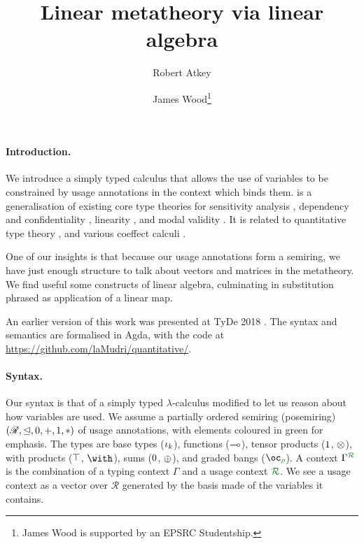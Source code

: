 \documentclass[a4paper]{easychair}
\begin{document}
\title{Linear metatheory via linear algebra}

\author{
  Robert Atkey
  \and
  James Wood\thanks{James Wood is supported by an EPSRC Studentship.}
}



\maketitle

\paragraph{Introduction.}

We introduce a simply typed calculus \name{} that allows the use of variables to
be constrained by usage annotations in the context which binds them.
\name{} is a generalisation of existing core type theories for sensitivity analysis
\cite{reed10distance}, dependency and confidentiality \cite{abadi99core},
linearity \cite{Barber1996}, and modal validity \cite{judgmental}.
It is related to quantitative type theory \cite{quantitative-type-theory}, and
various coeffect calculi \cite{PetricekOM14,BrunelGMZ14,GhicaS14}.

One of our insights is that because our usage annotations form a semiring, we
have just enough structure to talk about vectors and matrices in the metatheory.
We find useful some constructs of linear algebra, culminating in substitution
phrased as application of a linear map.

An earlier version of this work was presented at TyDe 2018
\cite{context-constrained}.
The syntax and semantics are formalised in Agda, with the code at
\url{https://github.com/laMudri/quantitative/}.

\paragraph{Syntax.}

Our syntax is that of a simply typed $\lambda$-calculus modified to let us
reason about how variables are used.
We assume a partially ordered semiring (posemiring) $(\mathscr R, \trianglelefteq, 0,
+, 1, *)$ of usage annotations, with elements coloured in green for emphasis.
The types are base types ($\iota_k$), functions ($\multimap$), tensor products
($1$, $\otimes$), with products ($\top$, $\withT{}{}$), sums
($0$, $\oplus$), and graded bangs ($\excl{\rho}{}$).
A context $\ctx{\Gamma}{R}$ is the combination of a typing context $\Gamma$ and
a usage context $\resctx R$.
We see a usage context as a vector over $\mathscr R$ generated by the basis made
of the variables it contains.
\end{document}
